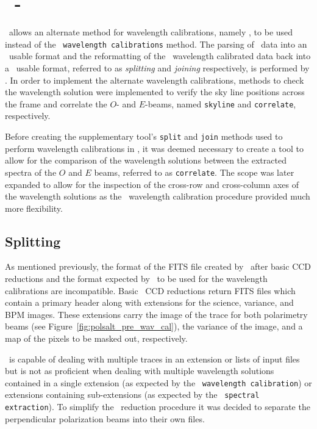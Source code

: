 
\section[\stops]{\stops\ - } \label{sec:stops}

\stops\ allows an alternate method for wavelength calibrations, namely \iraf, to be used instead of the \polsalt\ \texttt{wavelength calibrations} method. The parsing of \polsalt\ data into an \iraf\ usable format and the reformatting of the \iraf\ wavelength calibrated data back into a \polsalt\ usable format, referred to as \textit{splitting} and \textit{joining} respectively, is performed by \stops. In order to implement the alternate wavelength calibrations, methods to check the wavelength solution were implemented to verify the sky line positions across the frame and correlate the $O$- and $E$-beams, named \texttt{skyline} and \texttt{correlate}, respectively.

Before creating the supplementary tool's \texttt{split} and \texttt{join} methods used to perform wavelength calibrations in \iraf, it was deemed necessary to create a tool to allow for the comparison of the wavelength solutions between the extracted spectra of the $O$ and $E$ beams, referred to as \texttt{correlate}. The scope was later expanded to allow for the inspection of the cross-row and cross-column axes of the wavelength solutions as the \iraf\ wavelength calibration procedure provided much more flexibility.

\subsection{Splitting}

As mentioned previously, the format of the \gls{FITS} file created by \polsalt\ after basic \gls{CCD} reductions and the format expected by \iraf\ to be used for the wavelength calibrations are incompatible. Basic \polsalt\ \gls{CCD} reductions return \gls{FITS} files which contain a primary header along with extensions for the science, variance, and \gls{BPM} images. These extensions carry the image of the trace for both polarimetry beams (see Figure~\ref{fig:polsalt_pre_wav_cal}), the variance of the image, and a map of the pixels to be masked out, respectively.

\iraf\ is capable of dealing with multiple traces in an extension or lists of input files but is not as proficient when dealing with multiple wavelength solutions contained in a single extension (as expected by the \polsalt\ \texttt{wavelength calibration}) or extensions containing sub-extensions (as expected by the \polsalt\ \texttt{spectral extraction}). To simplify the \iraf\ reduction procedure it was decided to separate the perpendicular polarization beams into their own files.


